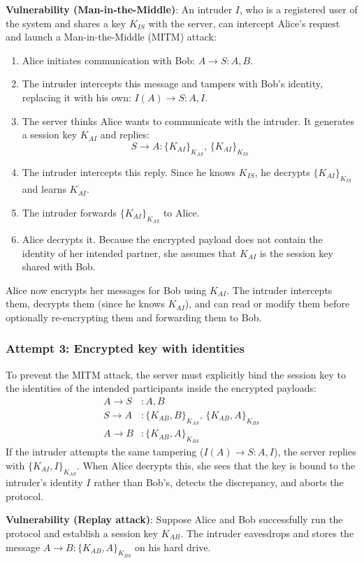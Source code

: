 \textbf{Vulnerability (Man-in-the-Middle)}: An intruder $I$, who is a registered user of the system and shares a key $K_{IS}$ with the server, can intercept Alice's request and launch a Man-in-the-Middle (MITM) attack:
\begin{enumerate}
  \item Alice initiates communication with Bob: $A \to S : A, B$.
  \item The intruder intercepts this message and tampers with Bob's identity, replacing it with his own: $I(A) \to S : A, I$.
  \item The server thinks Alice wants to communicate with the intruder. It generates a session key $K_{AI}$ and replies:
  \[
    S \to A : \{K_{AI}\}_{K_{AS}}, \, \{K_{AI}\}_{K_{IS}}
  \]
  \item The intruder intercepts this reply. Since he knows $K_{IS}$, he decrypts $\{K_{AI}\}_{K_{IS}}$ and learns $K_{AI}$.
  \item The intruder forwards $\{K_{AI}\}_{K_{AS}}$ to Alice.
  \item Alice decrypts it. Because the encrypted payload does not contain the identity of her intended partner, she assumes that $K_{AI}$ is the session key shared with Bob.
\end{enumerate}
Alice now encrypts her messages for Bob using $K_{AI}$. The intruder intercepts them, decrypts them (since he knows $K_{AI}$), and can read or modify them before optionally re-encrypting them and forwarding them to Bob.

\subsubsection{Attempt 3: Encrypted key with identities}
To prevent the MITM attack, the server must explicitly bind the session key to the identities of the intended participants inside the encrypted payloads:
\begin{align*}
  A \to S &: A, B \\
  S \to A &: \{K_{AB}, B\}_{K_{AS}}, \, \{K_{AB}, A\}_{K_{BS}} \\
  A \to B &: \{K_{AB}, A\}_{K_{BS}}
\end{align*}
If the intruder attempts the same tampering ($I(A) \to S : A, I$), the server replies with $\{K_{AI}, I\}_{K_{AS}}$. When Alice decrypts this, she sees that the key is bound to the intruder's identity $I$ rather than Bob's, detects the discrepancy, and aborts the protocol.

\textbf{Vulnerability (Replay attack)}: Suppose Alice and Bob successfully run the protocol and establish a session key $K_{AB}$. The intruder eavesdrops and stores the message $A \to B : \{K_{AB}, A\}_{K_{BS}}$ on his hard drive.

